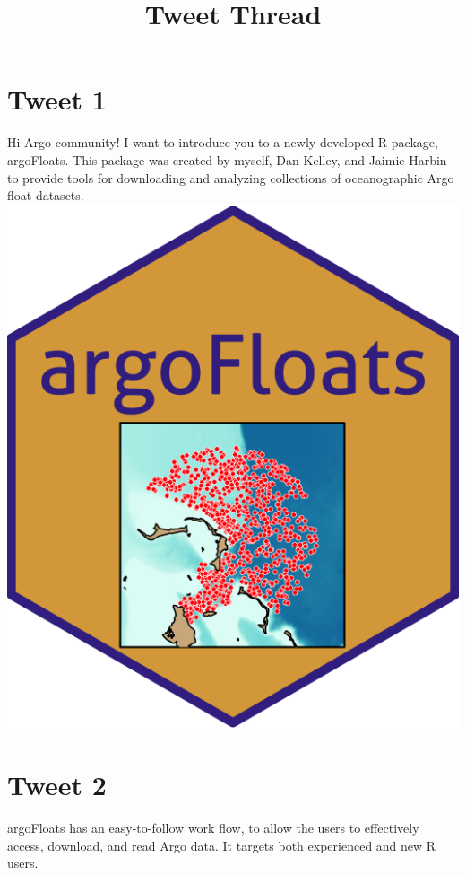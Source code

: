 \documentclass[
]{article}
\title{Tweet Thread}
\author{}
\date{\vspace{-2.5em}}
\begin{document}
\maketitle

\hypertarget{tweet-1}{%
\section{Tweet 1}\label{tweet-1}}

Hi Argo community! I want to introduce you to a newly developed R
package, argoFloats. This package was created by myself, Dan Kelley, and
Jaimie Harbin to provide tools for downloading and analyzing collections
of oceanographic Argo float datasets.
\includegraphics{../18_tweets/argoFloats_logo_06.png}

\hypertarget{tweet-2}{%
\section{Tweet 2}\label{tweet-2}}

argoFloats has an easy-to-follow work flow, to allow the users to
effectively access, download, and read Argo data. It targets both
experienced and new R users.
\end{document}
